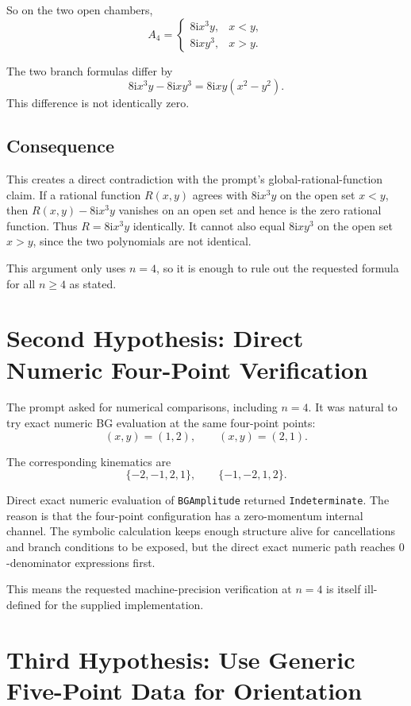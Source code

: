 \documentclass[11pt]{article}
\newcommand{\code}[1]{\texttt{#1}}
\newcommand{\ii}{\mathrm{i}}
\begin{document}
So on the two open chambers,
\[
  A_4 =
  \begin{cases}
    8\ii x^3y, & x<y,\\
    8\ii xy^3, & x>y.
  \end{cases}
\]

The two branch formulas differ by
\[
  8\ii x^3y-8\ii xy^3 = 8\ii xy(x^2-y^2).
\]
This difference is not identically zero.

\subsection*{Consequence}

This creates a direct contradiction with the prompt's global-rational-function
claim.  If a rational function \(R(x,y)\) agrees with \(8\ii x^3y\) on the
open set \(x<y\), then \(R(x,y)-8\ii x^3y\) vanishes on an open set and hence
is the zero rational function.  Thus \(R=8\ii x^3y\) identically.  It cannot
also equal \(8\ii xy^3\) on the open set \(x>y\), since the two polynomials are
not identical.

This argument only uses \(n=4\), so it is enough to rule out the requested
formula for all \(n\geq4\) as stated.

\section{Second Hypothesis: Direct Numeric Four-Point Verification}

The prompt asked for numerical comparisons, including \(n=4\).  It was natural
to try exact numeric BG evaluation at the same four-point points:
\[
  (x,y)=(1,2),\qquad (x,y)=(2,1).
\]

The corresponding kinematics are
\[
  \{-2,-1,2,1\},\qquad \{-1,-2,1,2\}.
\]

Direct exact numeric evaluation of \code{BGAmplitude} returned
\code{Indeterminate}.  The reason is that the four-point configuration has a
zero-momentum internal channel.  The symbolic calculation keeps enough
structure alive for cancellations and branch conditions to be exposed, but the
direct exact numeric path reaches \(0\)-denominator expressions first.

This means the requested machine-precision verification at \(n=4\) is itself
ill-defined for the supplied implementation.

\section{Third Hypothesis: Use Generic Five-Point Data for Orientation}
\end{document}

